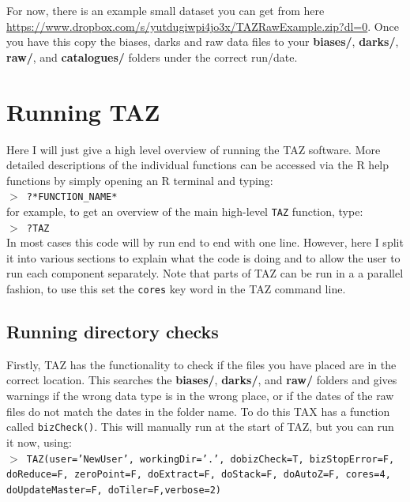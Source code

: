 \documentclass[12pt]{article}
\begin{document}
For now, there is an example small dataset you can get from here \url{https://www.dropbox.com/s/yutdugiwpi4jo3x/TAZRawExample.zip?dl=0}. Once you have this copy the biases, darks and raw data files to your \textbf{biases/}, \textbf{darks/}, \textbf{raw/}, and \textbf{catalogues/} folders under the correct run/date.  

\section{Running TAZ}

Here I will just give a high level overview of running the TAZ software. More detailed descriptions of the individual functions can be accessed via the R help functions by simply opening an R terminal and typing: \\

\hspace{10mm}  \texttt{$>$ ?*FUNCTION\_NAME*}\\

for example, to get an overview of the main high-level \texttt{TAZ} function, type:\\

\hspace{10mm}  \texttt{$>$ ?TAZ}\\

In most cases this code will by run end to end with one line. However, here I split it into various sections to explain what the code is doing and to allow the user to run each component separately. Note that parts of TAZ can be run in a a parallel fashion, to use this set the \texttt{cores} key word in the TAZ command line.

\subsection{Running directory checks}

Firstly, TAZ has the functionality to check if the files you have placed are in the correct location. This searches the \textbf{biases/}, \textbf{darks/}, and \textbf{raw/} folders and gives warnings if the wrong data type is in the wrong place, or if the dates of the raw files do not match the dates in the folder name. To do this TAX has a function called \texttt{bizCheck()}. This will manually run at the start of TAZ, but you can run it now, using:\\


\hspace{10mm} \texttt{$>$ TAZ(user='NewUser', workingDir='.', dobizCheck=T, bizStopError=F, \\ doReduce=F,  zeroPoint=F, doExtract=F, doStack=F, doAutoZ=F, cores=4, \\ doUpdateMaster=F, doTiler=F,verbose=2)}\\
\end{document}
